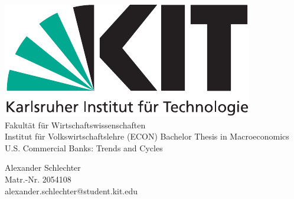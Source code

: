 \documentclass[12pt, a4paper]{article} %
\begin{document}

\begin{titlepage}
\begin{center}
\includegraphics[scale=0.65]{KITlogo}\\
\large
Fakultät für Wirtschaftswissenschaften\\
Institut für Volkswirtschaftslehre (ECON)
\vfill{
\Large
Bachelor Thesis in Macroeconomics\\\vspace{0.5cm}
}
\vfill{
\LARGE
U.S. Commercial Banks: Trends and Cycles
\\ 
\vspace{0.5cm}
\normalsize
}
\end{center}

\vfill{
\normalsize
\noindent Alexander Schlechter \\
Matr.-Nr. 2054108 \\
alexander.schlechter@student.kit.edu}
\end{titlepage}
\newpage


\tableofcontents
\newpage
{}


\end{document}
